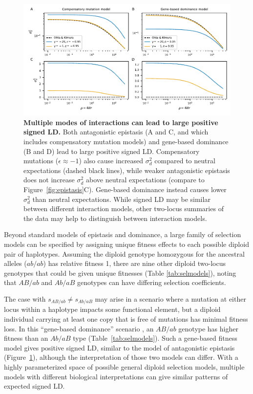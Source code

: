 \documentclass[]{article}
\begin{document}
\begin{figure}[tb!]
    \centering
    \includegraphics{../figures/gene-based-compensatory}
    \caption{
        \textbf{Multiple modes of interactions can lead to large positive signed LD.}
        Both antagonistic epistasis (A and C, and which includes compensatory mutation
        models) and gene-based dominance (B and D) lead to large positive signed LD.
        Compensatory mutations (\(\epsilon \approx -1\)) also cause increased
        \(\sigma_d^2\) compared to neutral expectations (dashed black lines),
        while weaker antagonistic epistasis does not increase \(\sigma_d^2\) above
        neutral expectations (compare to Figure~\ref{fig:epistasis}C).
        Gene-based dominance instead causes lower \(\sigma_d^2\) than neutral
        expectations.
        While signed LD may be similar between different interaction models,
        other two-locus summaries of the data may help to distinguish between
        interaction models.
        }
    \label{fig:gene-based-compensatory}
\end{figure}

Beyond standard models of epistasis and dominance, a large family of selection
models can be specified by assigning unique fitness effects to each possible
diploid pair of haplotypes. Assuming the diploid genotype homozygous for the
ancestral alleles (\(ab/ab\)) has relative fitness 1, there are nine other
diploid two-locus genotypes that could be given unique fitnesses (Table
\ref{tab:selmodels}), noting that \(AB/ab\) and \(Ab/aB\) genotypes can have
differing selection coefficients.

The case with \(s_{AB/ab} \not= s_{Ab/aB}\) may arise in a scenario where a
mutation at either locus within a haplotype impacts some functional element,
but a diploid individual carrying at least one copy that is free of mutations
has minimal fitness loss. In this ``gene-based dominance'' scenario
\citep[e.g.,][]{Sanjak2017-zw}, an \(AB/ab\) genotype has higher fitness than
an \(Ab/aB\) type (Table~\ref{tab:selmodels}). Such a gene-based fitness model gives
positive signed LD, similar to the model of antagonistic epistasis
(Figure~\ref{fig:gene-based-compensatory}), although the interpretation of
those two models can differ. With a highly parameterized space of possible
general diploid selection models, multiple models with different biological
interpretations can give similar patterns of expected signed LD.
\end{document}
